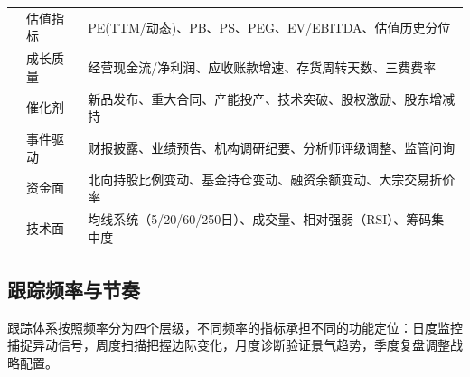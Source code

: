\begin{exhibitbox}[表9-1：三层监控体系核心指标维度]
\begin{tabularx}{\textwidth}{l X l}
\rowcolor{riskgreen!6}
& 估值指标 & PE(TTM/动态)、PB、PS、PEG、EV/EBITDA、估值历史分位 \\
\rowcolor{riskgreen!6}
& 成长质量 & 经营现金流/净利润、应收账款增速、存货周转天数、三费费率 \\
\rowcolor{riskgreen!6}
& 催化剂 & 新品发布、重大合同、产能投产、技术突破、股权激励、股东增减持 \\
\rowcolor{riskgreen!6}
& 事件驱动 & 财报披露、业绩预告、机构调研纪要、分析师评级调整、监管问询 \\
\rowcolor{riskgreen!6}
& 资金面 & 北向持股比例变动、基金持仓变动、融资余额变动、大宗交易折价率 \\
\rowcolor{riskgreen!6}
\multirow{-7}{*}{\textbf{个股层}} & 技术面 & 均线系统（5/20/60/250日）、成交量、相对强弱（RSI）、筹码集中度 \\
\bottomrule
\end{tabularx}
\end{exhibitbox}

\subsection{跟踪频率与节奏}

跟踪体系按照频率分为四个层级，不同频率的指标承担不同的功能定位：日度监控捕捉异动信号，周度扫描把握边际变化，月度诊断验证景气趋势，季度复盘调整战略配置。

